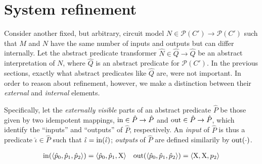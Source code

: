 \section{System refinement}


Consider another fixed, but arbitrary, circuit model $N \in \mathcal{P}(C') \rightarrow \mathcal{P}(C')$ such that $M$ and $N$ have the same number of inputs and outputs but can differ internally. Let the abstract predicate transformer $\hat N \in \hat Q \rightarrow \hat Q$ be an abstract interpretation of $N$, where $\hat Q$ is an abstract predicate for $\mathcal{P}(C')$. In the previous sections, exactly what abstract predicates like $\hat Q$ are, were not important. In order to reason about refinement, however, we  make a distinction between their \textit{external} and \textit{internal} elements.

Specifically, let the \textit{externally visible} parts of an abstract predicate $\hat P$ be those given by two idempotent mappings, $\operatorname{in} \in \hat P \rightarrow \hat P$ and $\operatorname{out} \in \hat P \rightarrow \hat P$, which identify the ``inputs'' and ``outputs'' of $\hat P$, respectively. An \textit{input} of $\hat P$ is thus a predicate $\hat \iota \in \hat P$ such that $\hat \iota = \operatorname{in}(\hat \iota)$; \textit{outputs} of $\hat P$ are defined similarily by $\operatorname{out}(\cdot)$.

\begin{align*}
\operatorname{in}(\langle \hat p_{0}, \hat p_{1}, \hat p_{2} \rangle) = \langle \hat p_{0}, \hat p_{1}, \mathrm{X} \rangle && \operatorname{out}(\langle \hat p_{0}, \hat p_{1}, \hat p_{2} \rangle) = \langle \mathrm{X}, \mathrm{X}, p_{2} \rangle
\end{align*}



